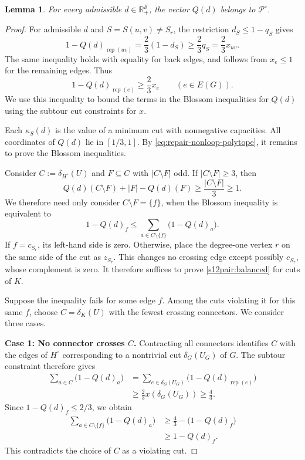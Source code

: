 \documentclass[11pt]{amsart}
\DeclareMathOperator{\R}{\mathbb{R}}
\newcommand{\rep}[1]{\operatorname{rep}(#1)}
\def\R{{\mathbb R}}
\newcommand{\1}{\mathbbm{1}}
\newtheorem{lemma}[theorem]{Lemma}
\begin{document}
\begin{lemma}\label{s12pair:connector-completion}
{For every admissible $d\in\R_+^{\mathcal S}$,
the vector $Q(d)$ belongs to $\mathcal P^\circ$.}
\end{lemma}

\begin{proof}
{
For admissible $d$ and $S=S(u,v)\ne S_r$, the restriction $d_S\le1-q_S$ gives
}
\[
 1-{Q(d)}_{\rep{uv}}
 =\frac23(1-d_S)
 \ge\frac23q_S
 =\frac23x_{uv}.
\]
The same inequality holds with equality for back edges,
and follows from $x_e\le1$ for the remaining edges. Thus
\[
 1-{Q(d)}_{\rep{e}}\ge\frac23x_e
 \qquad(e\in E(G)).
\]
We use this inequality to bound the terms in the Blossom
inequalities for ${Q(d)}$ using the subtour cut constraints for $x$.

Each $\kappa_S(d)$ is the value of a minimum cut with nonnegative
capacities.
All coordinates of ${Q(d)}$ lie in $[1/3,1]$.
By \eqref{eq:repair-nonloop-polytope}, it remains to
prove the Blossom inequalities.

Consider $C:=\delta_{H^\circ}(U)$ and $F\subseteq C$ with
$|C\setminus F|$ odd. If $|C\setminus F|\ge3$, then
\[
 {Q(d)}(C\setminus F)+|F|-{Q(d)}(F)
 \ge\frac{|C\setminus F|}{3}\ge1.
\]
We therefore need only consider $C\setminus F=\{f\}$,
when the Blossom inequality is equivalent to
\begin{equation}\label{s12pair:balanced}
 1-{Q(d)}_f\le
 \sum_{a\in C\setminus\{f\}}\bigl(1-{Q(d)}_a\bigr).
\end{equation}
If $f=c_{S_r}$, its left-hand side is zero.
Otherwise, place the degree-one vertex $r$ on the same side
of the cut as $z_{S_r}$. This changes no crossing edge except
possibly $c_{S_r}$, whose complement is zero. It therefore
suffices to prove \eqref{s12pair:balanced} for cuts of $K$.

Suppose the inequality fails for some edge $f$.
Among the cuts violating it for this same $f$, choose
$C=\delta_K(U)$ with the fewest crossing connectors.
We consider three cases.

\smallskip\noindent
\textbf{Case 1: No connector crosses $C$.}
Contracting all connectors identifies $C$ with the edges of
$H^\circ$ corresponding to a nontrivial cut $\delta_G(U_G)$ of $G$.
The subtour constraint therefore gives
\[
 \begin{aligned}
 \sum_{a\in C}\bigl(1-{Q(d)}_a\bigr)
 &=\sum_{e\in\delta_G(U_G)}\bigl(1-{Q(d)}_{\rep{e}}\bigr)\\
 &\ge\frac23x(\delta_G(U_G))\ge\frac43.
 \end{aligned}
\]
Since $1-{Q(d)}_f\le2/3$, we obtain
\[
 \begin{aligned}
 \sum_{a\in C\setminus\{f\}}\bigl(1-{Q(d)}_a\bigr)
 &\ge\frac43-\bigl(1-{Q(d)}_f\bigr)\\
 &\ge1-{Q(d)}_f.
 \end{aligned}
\]
This contradicts the choice of $C$ as a violating cut.


\end{proof}
\end{document}
